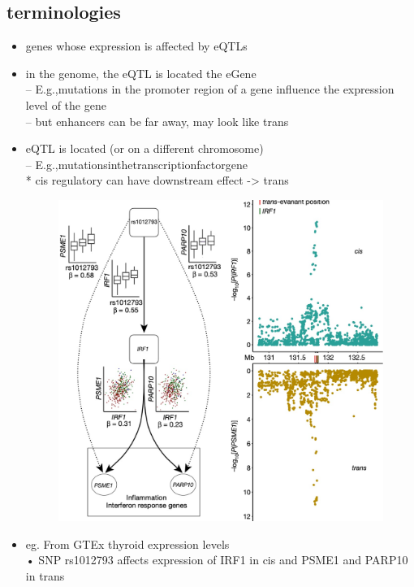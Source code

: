 \documentclass[font=12pt]{article}
\begin{document}
\subsection{terminologies}
\begin{itemize}
	\item {} genes whose expression is affected by eQTLs
	\item {} in the genome, the eQTL is located  the eGene\\
	– E.g.,mutations in the promoter region of a gene influence the expression level of the gene\\
	-- but enhancers can be far away, may look like trans
	\item {} eQTL is located  (or on a different chromosome) \\
	– E.g.,mutationsinthetranscriptionfactorgene\\
	* cis regulatory can have downstream effect -> trans \begin{figure}[h!]
		\centering
		\includegraphics[width=0.7\linewidth]{cistranseqtl}
		\label{fig:cistranseqtl}
	\end{figure}
	\item eg. From GTEx thyroid expression levels\\
	• SNP rs1012793 affects expression of IRF1 in cis and PSME1 and PARP10 in trans
\end{itemize}
\end{document}
